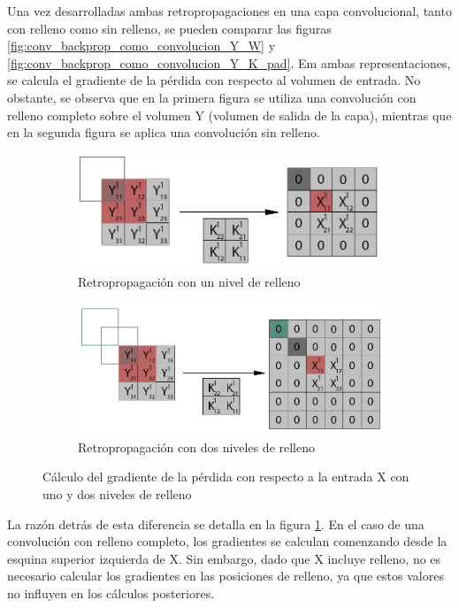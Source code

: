 Una vez desarrolladas ambas retropropagaciones en una capa convolucional, tanto con relleno como sin relleno, se pueden comparar las figuras \ref{fig:conv_backprop_como_convolucion_Y_W} y \ref{fig:conv_backprop_como_convolucion_Y_K_pad}. Em ambas representaciones, se calcula el gradiente de la pérdida con respecto al volumen de entrada. No obstante, se observa que en la primera figura se utiliza una convolución con relleno completo sobre el volumen Y (volumen de salida de la capa), mientras que en la segunda figura se aplica una convolución sin relleno.


\begin{figure}[H]
	\centering
	\begin{subfigure}{.5\textwidth}
		\includegraphics[width=1.4\linewidth]{imagenes/full_vs_normal_conv_1.jpg}  
		\caption{Retropropagación con un nivel de relleno}
	\end{subfigure}
	
	\vspace{5mm}
	\begin{subfigure}{.5\textwidth}
		\includegraphics[width=1.4\linewidth]{imagenes/full_vs_normal_conv_2.jpg}  
		\caption{Retropropagación con dos niveles de relleno}
	\end{subfigure}
	\caption{Cálculo del gradiente de la pérdida con respecto a la entrada X con uno y dos niveles de relleno}
	\label{fig:conv_full_vs_normal}
\end{figure}

La razón detrás de esta diferencia se detalla en la figura \ref{fig:conv_full_vs_normal}. En el caso de una convolución con relleno completo, los gradientes se calculan comenzando desde la esquina superior izquierda de X. Sin embargo, dado que X incluye relleno, no es necesario calcular los gradientes en las posiciones de relleno, ya que estos valores no influyen en los cálculos posteriores.
